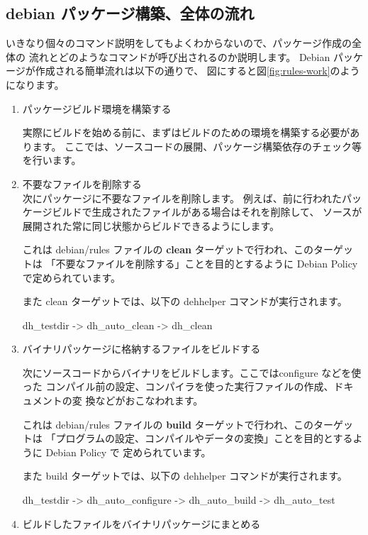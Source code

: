 \documentclass[mingoth,a4paper]{jsarticle}
\begin{document}
\subsection{debian パッケージ構築、全体の流れ}

いきなり個々のコマンド説明をしてもよくわからないので、パッケージ作成の全体の
流れとどのようなコマンドが呼び出されるのか説明します。
Debian パッケージが作成される簡単流れは以下の通りで、
図にすると図\ref{fig:rules-work}のようになります。

\begin{enumerate}
\item パッケージビルド環境を構築する

実際にビルドを始める前に、まずはビルドのための環境を構築する必要があります。
ここでは、ソースコードの展開、パッケージ構築依存のチェック等を行います。

\item 不要なファイルを削除する\\
次にパッケージに不要なファイルを削除します。
例えば、前に行われたパッケージビルドで生成されたファイルがある場合はそれを削除して、
ソースが展開された常に同じ状態からビルドできるようにします。

これは debian/rules ファイルの {\bf clean} ターゲットで行われ、このターゲットは
「不要なファイルを削除する」ことを目的とするように Debian Policy で定められています。

また clean ターゲットでは、以下の dehhelper コマンドが実行されます。
\begin{commandline}
dh_testdir -> dh_auto_clean -> dh_clean
\end{commandline}

\item  バイナリパッケージに格納するファイルをビルドする

次にソースコードからバイナリをビルドします。ここではconfigure などを使った
コンパイル前の設定、コンパイラを使った実行ファイルの作成、ドキュメントの変
換などがおこなわれます。

これは debian/rules ファイルの {\bf build} ターゲットで行われ、このターゲットは
「プログラムの設定、コンパイルやデータの変換」ことを目的とするように Debian Policy で
定められています。

また build ターゲットでは、以下の dehhelper コマンドが実行されます。
\begin{commandline}
dh_testdir -> dh_auto_configure -> dh_auto_build -> dh_auto_test
\end{commandline}

\item ビルドしたファイルをバイナリパッケージにまとめる


\end{enumerate}
\end{document}
